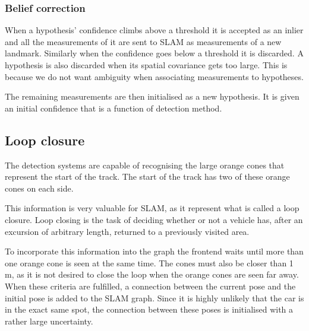 \subsubsection{Belief correction}

When a hypothesis' confidence climbs above a threshold it is accepted as an inlier and all the measurements of it are sent to SLAM as measurements of a new landmark. Similarly when the confidence goes below a threshold it is discarded. A hypothesis is also discarded when its spatial covariance gets too large. This is because we do not want ambiguity when associating measurements to hypotheses. 

The remaining measurements are then initialised as a new hypothesis. It is given an initial confidence that is a function of detection method.


\subsection{Loop closure}

The detection systems are capable of recognising the large orange cones that represent the start of the track. The start of the track has two of these orange cones on each side. 

This information is very valuable for \gls{SLAM}, as it represent what is called a loop closure. Loop closing is the task of deciding whether or not a vehicle has, after an excursion of arbitrary length, returned to a previously visited area.  

To incorporate this information into the graph the frontend waits until more than one orange cone is seen at the same time. The cones must also be closer than 1 \si{\metre}, as it is not desired to close the loop when the orange cones are seen far away. When these criteria are fulfilled, a connection between the current pose and the initial pose is added to the \gls{SLAM} graph. Since it is highly unlikely that the car is in the exact same spot, the connection between these poses is initialised with a rather large uncertainty.
